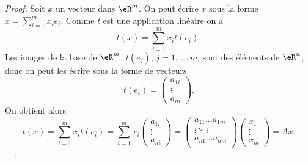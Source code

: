\begin{proof}
  Soit $x$ un vecteur dans $\eR^m$. On peut écrire $x$ sous la forme $ x=\sum_{i=1}^{m}x_i e_i$. Comme $t$ est une application linéaire on a
\[
t(x)=\sum_{i=1}^{m}x_it(e_i).
\]
Les images de la base de $\eR^m$, $t(e_j), \, j=1,\ldots,m$, sont des éléments de $\eR^n$, donc on peut les écrire sous la forme de vecteurs
\[
t(e_i)=
\begin{pmatrix}
  a_{1i}\\
\vdots\\
a_{ni}
\end{pmatrix}.
\] 
On obtient alors
\[
t(x)=\sum_{i=1}^{m}x_it(e_i)=\sum_{i=1}^{m}x_i\begin{pmatrix}
  a_{1i}\\
\vdots\\
a_{ni}
\end{pmatrix}=
\begin{pmatrix}
  a_{11} \ldots a_{1m}\\
\vdots \ddots \vdots\\
 a_{n1} \ldots a_{nm}\\
\end{pmatrix}
\begin{pmatrix}
  x_1\\
\vdots\\
x_m
\end{pmatrix}=Ax.
\]
\end{proof}

